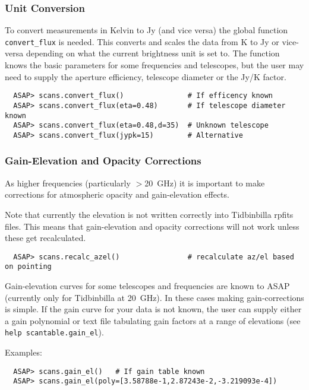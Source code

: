 \documentclass[11pt]{article}
\newcommand{\cmd}[1]{{\tt #1}}
\begin{document}
\subsubsection{Unit Conversion}

To convert measurements in Kelvin to Jy (and
vice versa) the global function \cmd{convert\_flux} is needed. This
converts and scales the data from K to Jy or vice-versa depending on
what the current brightness unit is set to. The function knows the
basic parameters for some frequencies and telescopes, but the user may
need to supply the aperture efficiency, telescope diameter or the Jy/K
factor.

\begin{verbatim}
  ASAP> scans.convert_flux()               # If efficency known
  ASAP> scans.convert_flux(eta=0.48)       # If telescope diameter known
  ASAP> scans.convert_flux(eta=0.48,d=35)  # Unknown telescope
  ASAP> scans.convert_flux(jypk=15)        # Alternative
\end{verbatim}

\subsubsection{Gain-Elevation and Opacity Corrections}
\label{sec:gainel}

As higher frequencies (particularly $>$20~GHz)
it is important to make corrections for atmospheric opacity and
gain-elevation effects.

Note that currently the elevation is not written correctly into
Tidbinbilla rpfits files. This means that gain-elevation and opacity
corrections will not work unless these get recalculated.

\begin{verbatim}
  ASAP> scans.recalc_azel()                # recalculate az/el based on pointing
\end{verbatim}

Gain-elevation curves for some telescopes and frequencies are known to
ASAP (currently only for Tidbinbilla at 20~GHz).  In these cases
making gain-corrections is simple.  If the gain curve for your data is
not known, the user can supply either a gain polynomial or text file
tabulating gain factors at a range of elevations (see \cmd{help
scantable.gain\_el}).

Examples:

\begin{verbatim}
  ASAP> scans.gain_el()   # If gain table known
  ASAP> scans.gain_el(poly=[3.58788e-1,2.87243e-2,-3.219093e-4])
\end{verbatim}
\end{document}
